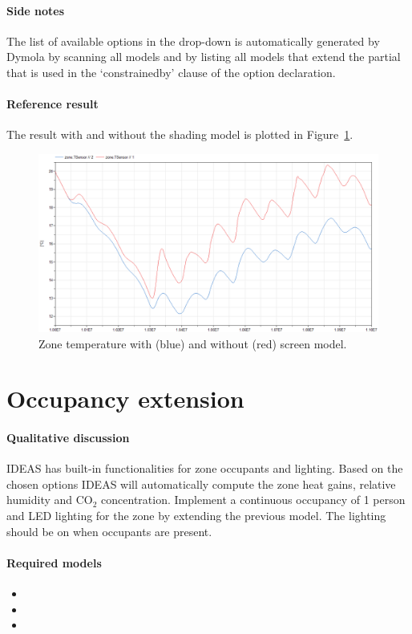 \documentclass[10pt,a4paper]{article}
\begin{document}
\paragraph{Side notes}
The list of available options in the drop-down is automatically generated by
Dymola by scanning all models and by listing all models that extend the partial
that is used in the `constrainedby' clause of the option declaration.


\paragraph{Reference result}
The result with and without the shading model
is plotted in Figure~\ref{fig:res2}.

\begin{figure}
\centering
\includegraphics[scale=0.6]{Example2.png}
\caption{Zone temperature with (blue) and without (red) screen model.}
\label{fig:res2}
\end{figure}


\section{Occupancy extension}
\paragraph{Qualitative discussion}
IDEAS has built-in functionalities for zone occupants and lighting.
Based on the chosen options IDEAS will automatically compute
the zone heat gains, relative humidity and CO$_2$ concentration.
Implement a continuous occupancy of 1 person and LED
lighting for the zone by extending the previous model.
The lighting should be on when occupants are present.

\paragraph{Required models}
\begin{itemize}
\item {}
\item {}
\item {}
\end{itemize}
\end{document}
